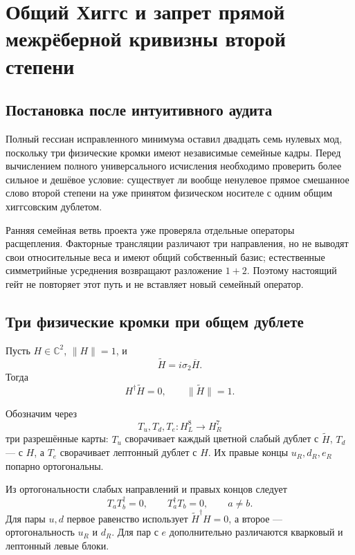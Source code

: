 \chapter{Общий Хиггс и запрет прямой межрёберной кривизны второй степени}

\section{Постановка после интуитивного аудита}

Полный гессиан исправленного минимума оставил двадцать семь нулевых мод,
поскольку три физические кромки имеют независимые семейные кадры. Перед
вычислением полного универсального исчисления необходимо проверить более
сильное и дешёвое условие: существует ли вообще ненулевое прямое
смешанное слово второй степени на уже принятом физическом носителе с одним
общим хиггсовским дублетом.

Ранняя семейная ветвь проекта уже проверяла отдельные операторы
расщепления. Факторные трансляции различают три направления, но не выводят
свои относительные веса и имеют общий собственный базис; естественные
симметрийные усреднения возвращают разложение $1+2$. Поэтому настоящий
гейт не повторяет этот путь и не вставляет новый семейный оператор.

\section{Три физические кромки при общем дублете}

Пусть $H\in\mathbb C^2$, $\|H\|=1$, и
\begin{equation}
 \widetilde H=i\sigma_2\overline H.
 \label{eq:v7-common-higgs-conjugate}
\end{equation}
Тогда
\begin{equation}
 H^\dagger\widetilde H=0,
 \qquad
 \|\widetilde H\|=1.
 \label{eq:v7-higgs-orthogonal-pair}
\end{equation}

Обозначим через
\begin{equation}
 T_u,T_d,T_e:H_L^8\longrightarrow H_R^7
 \label{eq:v7-physical-edge-maps}
\end{equation}
три разрешённые карты: $T_u$ сворачивает каждый цветной слабый дублет с
$\widetilde H$, $T_d$ --- с $H$, а $T_e$ сворачивает лептонный дублет с
$H$. Их правые концы $u_R,d_R,e_R$ попарно ортогональны.

Из ортогональности слабых направлений и правых концов следует
\begin{equation}
 T_aT_b^\dagger=0,
 \qquad
 T_a^\dagger T_b=0,
 \qquad a\ne b.
 \label{eq:v7-physical-edge-degree-two-orthogonality}
\end{equation}
Для пары $u,d$ первое равенство использует
$\widetilde H^\dagger H=0$, а второе --- ортогональность $u_R$ и $d_R$.
Для пар с $e$ дополнительно различаются кварковый и лептонный левые блоки.

